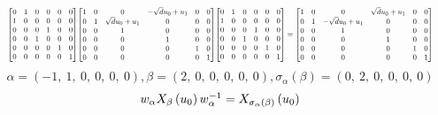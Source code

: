 \documentclass[11pt]{article}
\theoremstyle{definition}
\begin{document}
\[
\scaletoalign{\textwidth}{{\left[\begin{matrix}0 & 1 & 0 & 0 & 0 & 0\\1 & 0 & 0 & 0 & 0 & 0\\0 & 0 & 0 & 1 & 0 & 0\\0 & 0 & 1 & 0 & 0 & 0\\0 & 0 & 0 & 0 & 1 & 0\\0 & 0 & 0 & 0 & 0 & 1\end{matrix}\right]} {\left[\begin{matrix}1 & 0 & 0 & - \sqrt{d} u_{0} + u_{1} & 0 & 0\\0 & 1 & \sqrt{d} u_{0} + u_{1} & 0 & 0 & 0\\0 & 0 & 1 & 0 & 0 & 0\\0 & 0 & 0 & 1 & 0 & 0\\0 & 0 & 0 & 0 & 1 & 0\\0 & 0 & 0 & 0 & 0 & 1\end{matrix}\right]} {\left[\begin{matrix}0 & 1 & 0 & 0 & 0 & 0\\1 & 0 & 0 & 0 & 0 & 0\\0 & 0 & 0 & 1 & 0 & 0\\0 & 0 & 1 & 0 & 0 & 0\\0 & 0 & 0 & 0 & 1 & 0\\0 & 0 & 0 & 0 & 0 & 1\end{matrix}\right]} = {\left[\begin{matrix}1 & 0 & 0 & \sqrt{d} u_{0} + u_{1} & 0 & 0\\0 & 1 & - \sqrt{d} u_{0} + u_{1} & 0 & 0 & 0\\0 & 0 & 1 & 0 & 0 & 0\\0 & 0 & 0 & 1 & 0 & 0\\0 & 0 & 0 & 0 & 1 & 0\\0 & 0 & 0 & 0 & 0 & 1\end{matrix}\right]}}
\]
\[
\alpha = \left( -1, \  1, \  0, \  0, \  0, \  0\right), \beta = \left( 2, \  0, \  0, \  0, \  0, \  0\right), \sigma_{\alpha}(\beta) = \left( 0, \  2, \  0, \  0, \  0, \  0\right)
\]
\[
\scaletoalign{\textwidth}{w_{\alpha} X_{\beta}\left(u_{0}\right) w_{\alpha}^{-1} = X_{\sigma_{\alpha}\left(\beta\right)}\left(u_{0}\right)}
\]
\end{document}
